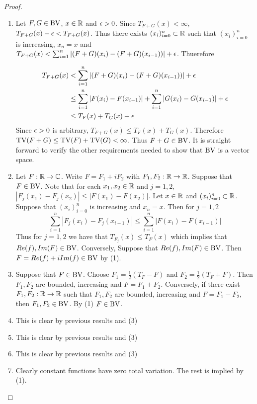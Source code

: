 \documentclass{book}
\begin{document}
	\begin{proof}
		\begin{enumerate}
			\item Let $F, G \in \text{BV}$, $x \in \mathbb{R}$ and $\epsilon>0$. Since $T_{F+G}(x) < \infty$, $T_{F+G}(x)-\epsilon< T_{F+G}(x)$. Thus there exists $(x_i)_{i=0}^n \subset \mathbb{R}$ such that $(x_i)_{i=0}^n$ is increasing, $x_n=x$ and $T_{F+G}(x) < \sum_{i=1}^n |(F+G)(x_i) - (F+G)(x_{i-1}))|+ \epsilon$. Thuerefore 
			
			\begin{align*}
				T_{F+G}(x)
				& < \sum_{i=1}^n |(F+G)(x_i) - (F+G)(x_{i-1}))|+ \epsilon\\
				& \leq \sum_{i=1}^n |F(x_i)-F(x_{i-1})|+ \sum_{i=1}^n|G(x_i)-G(x_{i-1})| + \epsilon\\
				& \leq T_F(x) + T_G(x) + \epsilon
			\end{align*}
			Since $\epsilon >0$ is arbitrary, $T_{F+G}(x) \leq T_F(x)+T_G(x)$. Therefore $\text{TV}(F+G) \leq \text{TV}(F)+\text{TV}(G)<\infty$. Thus $F+G \in \text{BV}$. It is straight forward to verify the other requirements needed to show that $\text{BV}$ is a vector space.
			
			\item Let $F: \mathbb{R} \rightarrow \mathbb{C}$. Write $F=F_1+iF_2$ with $F_1, F_2:\mathbb{R} \rightarrow \mathbb{R}$. Suppose that $F \in \text{BV}$. Note that for each $x_1,x_2 \in \mathbb{R}$ and $j =1,2$, $|F_j(x_1)-F_j(x_2)| \leq |F(x_1)-F(x_2)|$. Let $x\in \mathbb{R}$ and $(x_i)_{i=0}^n \subset \mathbb{R}$. Suppose that $(x_i)_{i=0}^n$ is increasing and $x_n=x$. Then for $j=1,2$ 
			$$\sum_{i=1}^n|F_j(x_i)-F_j(x_{i-1})| \leq \sum_{i=1}^n|F(x_i)-F(x_{i-1})|$$
			Thus for $j=1,2$ we have that $T_{F_j}(x) \leq T_F(x)$ which implies that $Re(f),Im(F) \in \text{BV}$. Conversely, Suppose that $Re(f), Im(F) \in \text{BV}$. Then $F=Re(f)+iIm(f) \in \text{BV}$ by (1).
			\item Suppose that $F \in \text{BV}$. Choose $F_1=\frac{1}{2}(T_F-F)$ and $F_2=\frac{1}{2}(T_F+F)$. Then $F_1,F_2$ are bounded, increasing and $F=F_1+F_2$. Conversely, if there exist $F_1,F_2:\mathbb{R} \rightarrow \mathbb{R}$ such that $F_1,F_2$ are bounded, increasing and $F=F_1-F_2$, then $F_1, F_2 \in \text{BV}$. By (1) $F \in \text{BV}$.
			\item This is clear by previous results and (3)
			\item This is clear by previous results and (3)
			\item This is clear by previous results and (3)
			\item Clearly constant functions have zero total variation. The rest is implied by (1).
		\end{enumerate}
	\end{proof}
	
\end{document}
